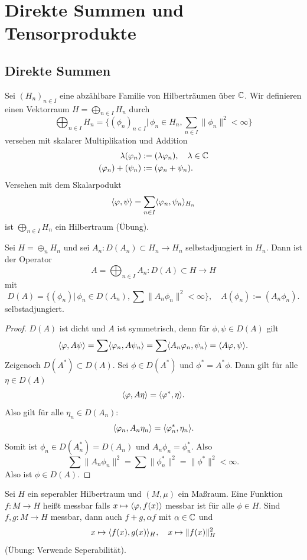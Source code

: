 \documentclass{mycourse}
\begin{document}
\chapter{Direkte Summen und Tensorprodukte}\label{8}
\section{Direkte Summen}
Sei $(H_n)_{n\in I}$ eine abzählbare Familie von Hilberträumen über $\mathbb{C}$. Wir definieren einen Vektorraum $H= \bigoplus_{n\in I} H_n$ durch
\[
 \bigoplus_{n\in I} H_n = \{(\phi_n)_{n\in I} | \, \phi_n \in H_n, \sum_{n\in I} \| \phi_n\|^2 < \infty\}
\]
versehen mit skalarer Multiplikation und Addition
\begin{align*}
\lambda (\varphi_n) &:= (\lambda \varphi_n), \quad \lambda \in \mathbb{C}\\
(\varphi_n) + (\psi_n) &:= (\varphi_n + \psi_n).
\end{align*}
Versehen mit dem Skalarpodukt
\[
\langle \varphi, \psi\rangle = \sum_{n\in I} \langle \varphi_n, \psi_n\rangle_{H_n}
\]
ist $\bigoplus_{n\in I} H_n$ ein Hilbertraum (Übung).

\begin{st}\label{8.1}
Sei $H=\oplus_n H_n$ und sei $A_n: D(A_n) \subset H_n \to H_n$ selbstadjungiert in $H_n$. Dann ist der Operator
\[
A= \bigoplus_{n\in I} A_n: D(A) \subset H \to H
\]
mit
\[
D(A)= \{(\phi_n)|\, \phi_n \in D(A_n), \sum\|A_n \phi_n\|^2 <\infty\}, \quad A(\phi_n):= (A_n \phi_n).
\]
selbstadjungiert.
\end{st}
\begin{proof}
$D(A)$ ist dicht und $A$ ist symmetrisch, denn für $\phi, \psi \in D(A)$ gilt
\[
\langle \varphi, A\psi\rangle = \sum \langle \varphi_n, A\psi_n\rangle = \sum \langle A_n \varphi_n, \psi_n\rangle = \langle A\varphi, \psi\rangle.
\]
Zeigenoch $D(A^*) \subset D(A)$.
Sei $\phi \in D(A^*)$ und $\phi^*=A^*\phi$. Dann gilt für alle $\eta\in D(A)$
\[
\langle \varphi, A\eta\rangle = \langle \varphi^*, \eta\rangle.
\]
Also gilt für alle $\eta_n\in D(A_n)$:
\[
\langle \varphi_n, A_n \eta_n\rangle = \langle \varphi_n^*, \eta_n\rangle.
\]
Somit ist $\phi_n \in D(A_n^*) = D(A_n)$ und $A_n \phi_n = \phi_n^*$. Also
\[
\sum \| A_n \phi_n\|^2 = \sum \| \phi_n^* \|^2 = \| \phi^*\|^2 < \infty.
\]
Also ist $\phi \in D(A)$.
\end{proof}

Sei $H$ ein seperabler Hilbertraum und $(M, \mu)$ ein Maßraum. Eine Funktion $f: M \to H$ heißt messbar falls $x\mapsto \langle \varphi, f(x)\rangle$ messbar ist für alle $\phi \in H$. Sind $f,g: M \to H$ messbar, dann auch $f+g, \alpha f$ mit $\alpha \in \mathbb{C}$ und 
\[
x\mapsto \langle f(x), g(x) \rangle_H, \quad x \mapsto \| f(x)\|_H^2
\]
(Übung: Verwende Seperabilität).
\end{document}
